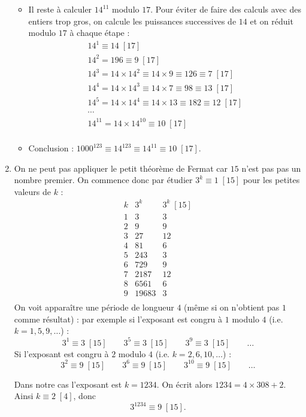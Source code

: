 \documentclass[11pt,class=report,crop=false]{standalone}
\begin{document}
\begin{enumerate}
\begin{itemize}
      \item Il reste à calculer $14^{11}$ modulo $17$.
      Pour éviter de faire des calculs avec des entiers trop gros, on calcule les puissances successives de $14$ et on réduit modulo $17$ à chaque étape :
      $$
      \begin{array}{c}
      14^1 \equiv 14 \; [17] \\
      14^2 = 196 \equiv 9 \; [17] \\
      14^3 = 14 \times 14^2 \equiv 14 \times 9 \equiv 126 \equiv 7 \; [17] \\
      14^4 = 14 \times 14^3 \equiv 14 \times 7 \equiv 98 \equiv 13 \; [17] \\ 
      14^5 = 14 \times 14^4 \equiv 14 \times 13 \equiv 182 \equiv 12 \; [17] \\ 
      \cdots \\  
      14^{11} = 14 \times 14^{10} \equiv 10 \; [17] \\
      \end{array}$$
      
     \item Conclusion :   $1000^{123} \equiv 14^{123} \equiv 14^{11} \equiv 10 \; [17]$.          
    \end{itemize}   

    \item On ne peut pas appliquer le petit théorème de Fermat car $15$ n'est pas pas un nombre premier.
    On commence donc par étudier $3^k \equiv 1 \; [15]$ pour les petites valeurs de $k$ :
      $$
\begin{array}{c|c|c}
 k & 3^k  & 3^k \; [15] \\ \hline  
 1  &  3  &  3 \\
 2  &  9  &  9 \\
 3  &  27  &  12 \\
 4  &  81  &  6 \\
 5  &  243  &  3 \\
 6  &  729  &  9 \\
 7  &  2187  &  12 \\
 8  &  6561  &  6 \\
 9  &  19683  &  3 \\
\end{array}$$  
On voit apparaître une période de longueur $4$ (même si on n'obtient pas $1$ comme résultat) : par exemple si l'exposant est congru à $1$ modulo $4$ (i.e.{} $k= 1,5,9,\ldots$) :
$$3^1 \equiv 3 \; [15] \qquad 3^5 \equiv 3 \; [15] \qquad 3^9 \equiv 3 \; [15] \qquad \ldots$$
Si l'exposant est congru à $2$ modulo $4$ (i.e.{} $k= 2,6,10,\ldots$) :
$$3^2 \equiv 9 \; [15] \qquad 3^6 \equiv 9 \; [15] \qquad 3^{10} \equiv 9 \; [15] \qquad \ldots$$

Dans notre cas l'exposant est $k=1234$.
On écrit alors $1234 = 4\times 308 + 2$. Ainsi $k\equiv 2 \; [4]$, donc  
$$3^{1234} \equiv 9 \; [15].$$    
\end{enumerate}
\fincorrection
\finexercice
\end{document}
